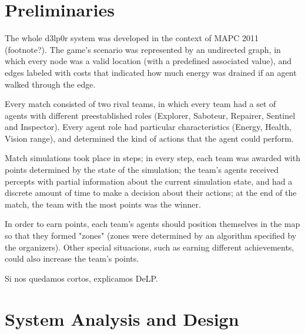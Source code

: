 \documentclass{llncs2e/llncs}
\begin{document}
\begin{comment}
    
PREGUNTAS {
1. What was the motivation to participate in the contest?
2. What is the history of the team?
3. What is the name of your team?
4. How many developers and designers did you have?  At what level of education 
are your team members?
5. From which field of research do you come form?  Which work is related?
}

== Preliminaries

\end{comment}

\section{Preliminaries}

    The whole d3lp0r system was developed in the context of MAPC 2011 (footnote?). 
    The game's scenario was represented by an undirected graph, in which every 
    node was a valid location (with a predefined associated value), and edges 
    labeled with costs that indicated how much energy was drained if an agent 
    walked through the edge.

    Every match consisted of two rival teams, in which every team had a set of 
    agents with different preestablished roles (Explorer, Saboteur, Repairer, 
    Sentinel and Inspector). Every agent role had particular characteristics 
    (Energy, Health, Vision range), and determined the kind of actions that the 
    agent could perform.

    Match simulations took place in steps; in every step, each team was awarded 
    with points determined by the state of the simulation; the team's agents 
    received percepts with partial information about the current simulation state, 
    and had a discrete amount of time to make a decision about their actions; at 
    the end of the match, the team with the most points was the winner.

    In order to earn points, each team's agents should position themselves in the 
    map so that they formed "zones" (zones were determined by an algorithm 
    specified by the organizers). Other special situacions, such as earning 
    different achievements, could also increase the team's points.


    Si nos quedamos cortos, explicamos DeLP.

\section{System Analysis and Design}
\end{document}
